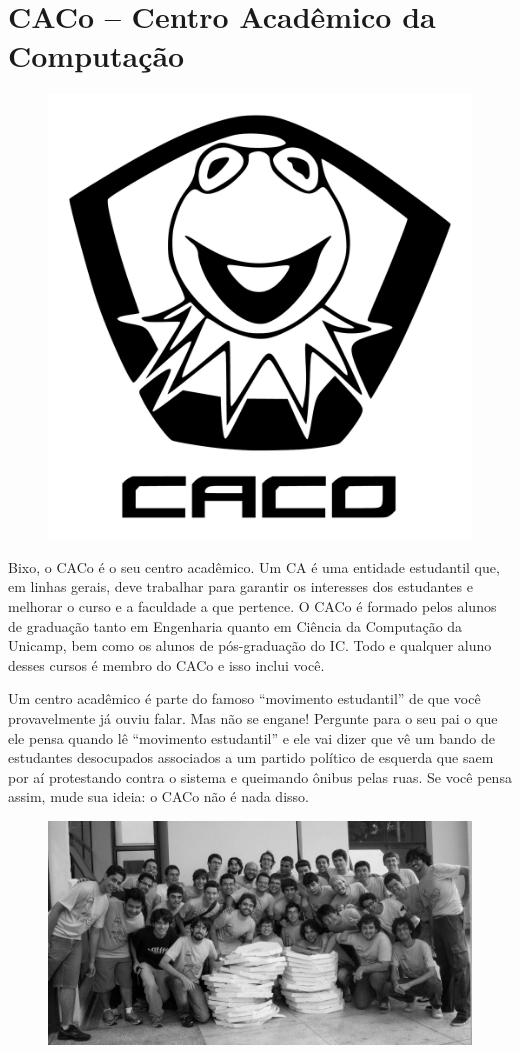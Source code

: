 
\section{CACo -- Centro Acadêmico da Computação}

\begin{figure}[H]
    \centering
    \includegraphics[width=.35\textwidth]{img/caco_logo.pdf}
\end{figure}

Bixo, o CACo é o seu centro acadêmico. Um CA é uma entidade estudantil que, em
linhas gerais, deve trabalhar para garantir os interesses dos estudantes e
melhorar o curso e a faculdade a que pertence. O CACo é formado pelos alunos de
graduação tanto em Engenharia quanto em Ciência da Computação da Unicamp, bem
como os alunos de pós-graduação do IC. Todo e qualquer aluno desses cursos é
membro do CACo e isso inclui você.

Um centro acadêmico é parte do famoso ``movimento estudantil'' de que você
provavelmente já ouviu falar. Mas não se engane! Pergunte para o seu pai o que
ele pensa quando lê ``movimento estudantil'' e ele vai dizer que vê um bando de
estudantes desocupados associados a um partido político de esquerda que saem por
aí protestando contra o sistema e queimando ônibus pelas ruas. Se você pensa
assim, mude sua ideia: o CACo não é nada disso.

\begin{figure}[H]
    \centering
    \includegraphics[width=.45\textwidth]{img/alem_da_graduacao/caco_pizzada1.jpg}
\end{figure}

